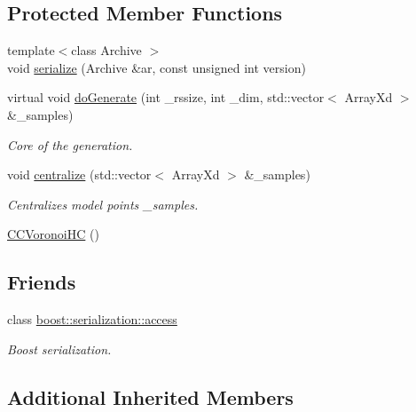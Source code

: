 \subsection*{Protected Member Functions}
\begin{DoxyCompactItemize}
\item 
{\footnotesize template$<$class Archive $>$ }\\void \hyperlink{class_go_s_u_m_1_1_c_c_voronoi_h_c_abbeaabd93028069b81be4dfc078e3d02}{serialize} (Archive \&ar, const unsigned int version)
\item 
virtual void \hyperlink{class_go_s_u_m_1_1_c_c_voronoi_h_c_ae3ecc9c8e8c09e42c13b77d0bfa8c020}{do\-Generate} (int \-\_\-rssize, int \-\_\-dim, std\-::vector$<$ Array\-Xd $>$ \&\-\_\-samples)
\begin{DoxyCompactList}\small\item\em Core of the generation. \end{DoxyCompactList}\item 
void \hyperlink{class_go_s_u_m_1_1_c_c_voronoi_h_c_a3988f3bc82cb71904e358ef13e9a68d4}{centralize} (std\-::vector$<$ Array\-Xd $>$ \&\-\_\-samples)
\begin{DoxyCompactList}\small\item\em Centralizes model points \-\_\-samples. \end{DoxyCompactList}\item 
\hyperlink{class_go_s_u_m_1_1_c_c_voronoi_h_c_a8c59858fea9d4e605b6207d8982b6931}{C\-C\-Voronoi\-H\-C} ()
\end{DoxyCompactItemize}
\subsection*{Friends}
\begin{DoxyCompactItemize}
\item 
class \hyperlink{class_go_s_u_m_1_1_c_c_voronoi_h_c_ac98d07dd8f7b70e16ccb9a01abf56b9c}{boost\-::serialization\-::access}
\begin{DoxyCompactList}\small\item\em Boost serialization. \end{DoxyCompactList}\end{DoxyCompactItemize}
\subsection*{Additional Inherited Members}


